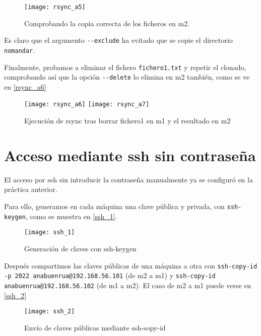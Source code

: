 \begin{figure}
\begin{center}
\caption{Comprobando la copia correcta de los ficheros en m2.}
\label{rsync_a5}
\texttt{[image: rsync\_a5]}
\end{center}
\end{figure}

Es claro que el argumento \verb|--exclude| ha evitado que se copie el directorio \verb|nomandar|.

Finalmente, probamos a eliminar el fichero \verb|fichero1.txt| y repetir el clonado, comprobando así que la opción \verb|--delete| lo elimina en m2 también, como se ve en \eqref{rsync_a6}

\begin{figure}
\begin{center}
\caption{Ejecución de rsync tras borrar fichero1 en m1 y el resultado en m2}
\label{rsync_a6}
\texttt{[image: rsync\_a6]}
\texttt{[image: rsync\_a7]}
\end{center}
\end{figure}

\chapter{Acceso mediante ssh sin contraseña}

El acceso por ssh sin introducir la contraseña manualmente ya se configuró en la práctica anterior.

Para ello, generamos en cada máquina una clave pública y privada, con \verb|ssh-keygen|, como se muestra en \eqref{ssh_1}.

\begin{figure}
\begin{center}
\caption{Generación de claves con ssh-keygen}
\label{ssh_1}
\texttt{[image: ssh\_1]}
\end{center}
\end{figure}

Después compartimos las claves públicas de una máquina a otra con \verb|ssh-copy-id -p 2022 anabuenrua@192.168.56.101| (de m2 a m1) y \verb|ssh-copy-id anabuenrua@192.168.56.102| (de m1 a m2). El caso de m2 a m1 puede verse en \eqref{ssh_2}

\begin{figure}
\begin{center}
\caption{Envío de claves públicas mediante ssh-sopy-id}
\label{ssh_2}
\texttt{[image: ssh\_2]}
\end{center}
\end{figure}


